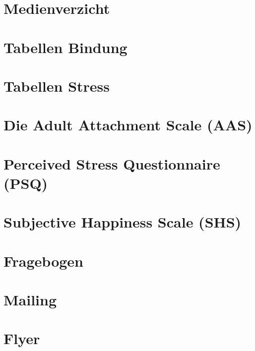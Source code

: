 \section{Medienverzicht}\label{app:Medienverzicht}

\newpage

\section{Tabellen Bindung}\label{app:TablesAas}

\newpage

\section{Tabellen Stress}\label{app:TablesPsq}

\newpage

\section{Die Adult Attachment Scale (AAS)}\label{app:AAS}

\newpage

\section{Perceived Stress Questionnaire (PSQ)}\label{app:PSQ}

\newpage

\section{Subjective Happiness Scale (SHS)}\label{app:SHS}
\newpage

\section{Fragebogen}\label{app:Fragebogen}

\newpage

\section{Mailing}\label{app:Mailing}

\newpage

\section{Flyer}\label{app:Flyer}

\newpage

